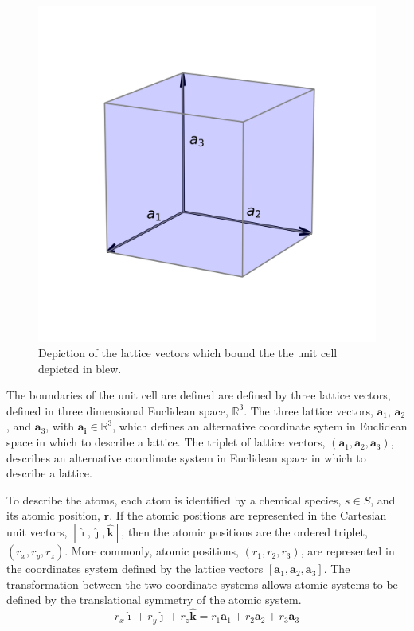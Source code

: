 \begin{figure}[ht]
	\centering
  \includegraphics{chapter3/unit_cell}
  \caption{Depiction of the lattice vectors which bound the the unit cell depicted in blew.}
  \label{fig:unit_cell}
\end{figure}

The boundaries of the unit cell are defined are defined by three lattice vectors, defined in three dimensional Euclidean space, $\mathbb{R}^3$.
The three lattice vectors, $\bm{a}_1$, $\bm{a}_2$, and $\bm{a}_3$, with $\bm{a_i}\in\mathbb{R}^3$, which defines an alternative coordinate sytem in Euclidean space in which to describe a lattice.
The triplet of lattice vectors, $(\bm{a}_1,\bm{a}_2,\bm{a}_3)$, describes an alternative coordinate system in Euclidean space in which to describe a lattice.

To describe the atoms, each atom is identified by a chemical species, $s\in S$, and its atomic position, $\bm{r}$.
If the atomic positions are represented in the Cartesian unit vectors, $[\hat{\bm{\imath}},\hat{\bm{\jmath}},\hat{\bm{k}}]$, then the atomic positions are the ordered triplet, $(r_x,r_y,r_z)$.
More commonly, atomic positions, $(r_1,r_2,r_3)$, are represented in the coordinates system defined by the lattice vectors $[\bm{a}_1,\bm{a}_2,\bm{a}_3]$.
The transformation between the two coordinate systems allows atomic systems to be defined by the translational symmetry of the atomic system.
\begin{equation}
	\label{eq:fractional_vs_cartesian_coordinates}
	r_x \hat{\bm{\imath}} + r_y \hat{\bm{\jmath}} + r_z \hat{\bm{k}}
	=
	r_1 \bm{a}_1 + r_2 \bm{a}_2 + r_3 \bm{a}_3
\end{equation}

